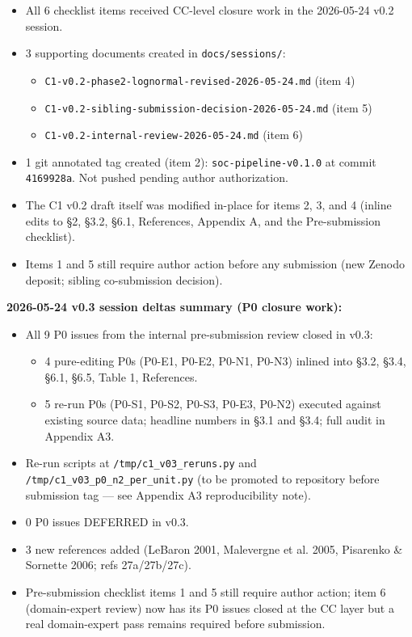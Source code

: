 \documentclass[
  11pt]{article}
\providecommand{\tightlist}{%
  \setlength{\itemsep}{0pt}\setlength{\parskip}{0pt}}
\begin{document}
\begin{itemize}
\tightlist
\item
  All 6 checklist items received CC-level closure work in the 2026-05-24
  v0.2 session.
\item
  3 supporting documents created in \texttt{docs/sessions/}:

  \begin{itemize}
  \tightlist
  \item
    \texttt{C1-v0.2-phase2-lognormal-revised-2026-05-24.md} (item 4)
  \item
    \texttt{C1-v0.2-sibling-submission-decision-2026-05-24.md} (item 5)
  \item
    \texttt{C1-v0.2-internal-review-2026-05-24.md} (item 6)
  \end{itemize}
\item
  1 git annotated tag created (item 2): \texttt{soc-pipeline-v0.1.0} at
  commit \texttt{4169928a}. Not pushed pending author authorization.
\item
  The C1 v0.2 draft itself was modified in-place for items 2, 3, and 4
  (inline edits to §2, §3.2, §6.1, References, Appendix A, and the
  Pre-submission checklist).
\item
  Items 1 and 5 still require author action before any submission (new
  Zenodo deposit; sibling co-submission decision).
\end{itemize}

\textbf{2026-05-24 v0.3 session deltas summary (P0 closure work):}

\begin{itemize}
\tightlist
\item
  All 9 P0 issues from the internal pre-submission review closed in
  v0.3:

  \begin{itemize}
  \tightlist
  \item
    4 pure-editing P0s (P0-E1, P0-E2, P0-N1, P0-N3) inlined into §3.2,
    §3.4, §6.1, §6.5, Table 1, References.
  \item
    5 re-run P0s (P0-S1, P0-S2, P0-S3, P0-E3, P0-N2) executed against
    existing source data; headline numbers in §3.1 and §3.4; full audit
    in Appendix A3.
  \end{itemize}
\item
  Re-run scripts at \texttt{/tmp/c1\_v03\_reruns.py} and
  \texttt{/tmp/c1\_v03\_p0\_n2\_per\_unit.py} (to be promoted to
  repository before submission tag --- see Appendix A3 reproducibility
  note).
\item
  0 P0 issues DEFERRED in v0.3.
\item
  3 new references added (LeBaron 2001, Malevergne et al. 2005,
  Pisarenko \& Sornette 2006; refs 27a/27b/27c).
\item
  Pre-submission checklist items 1 and 5 still require author action;
  item 6 (domain-expert review) now has its P0 issues closed at the CC
  layer but a real domain-expert pass remains required before
  submission.
\end{itemize}
\end{document}
